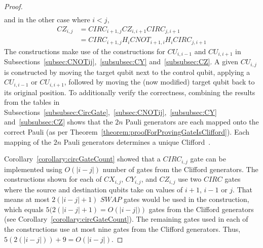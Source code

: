 \begin{proof}
\begin{align}
\end{align}
and in the other case where $i < j$,
\begin{align}
\mathit{CZ}_{i,j} &= \mathit{CIRC}_{i+1,j}\mathit{CZ}_{i,i+1}\mathit{CIRC}_{j,i+1}\\
&= \mathit{CIRC}_{i+1,j}H_{i}\mathit{CNOT}_{i+1,i}H_{i}\mathit{CIRC}_{j,i+1}
\end{align}
The constructions make use of the constructions for $\mathit{CU}_{i,i-1}$ and $\mathit{CU}_{i,i+1}$ in Subsections~\ref{subsec:CNOTij},~\ref{subsubsec:CY} and~\ref{subsubsec:CZ}. A given $\mathit{CU}_{i,j}$ is constructed by moving the target qubit next to the control qubit, applying a $\mathit{CU}_{i,i-1}$ or $\mathit{CU}_{i,i+1}$, followed by moving the (now modified) target qubit back to its original position. To additionally verify the correctness, combining the results from the tables in Subsections~\ref{subsubsec:CircGate},~\ref{subsec:CNOTij},~\ref{subsubsec:CY} and~\ref{subsubsec:CZ} shows that the $2n$ Pauli generators are each mapped onto the correct Pauli (as per Theorem~\ref{theorem:proofForProvingGateIsClifford}). Each mapping of the $2n$ Pauli generators determines a unique Clifford~\cite{ozols2008clifford}.

Corollary~\ref{corollary:circGateCount} showed that a $\mathit{CIRC}_{i,j}$ gate can be implemented using $O \left(\lvert i - j \rvert \right)$ number of gates from the Clifford generators. The constructions shown for each of $\mathit{CX}_{i,j}$, $\mathit{CY}_{i,j}$, and $\mathit{CZ}_{i,j}$ use two $\mathit{CIRC}$ gates where the source and destination qubits take on values of $i+1$, $i-1$ or $j$. That means at most $2(\lvert i - j \rvert + 1)$ $\mathit{SWAP}$ gates would be used in the construction, which equals $5(2(\lvert i - j \rvert + 1) = O \left(\lvert i - j \rvert) \right)$ gates from the Clifford generators (see Corollary~\ref{corollary:circGateCount}). The remaining gates used in each of the constructions use at most nine gates from the Clifford generators. Thus, $5(2(\lvert i - j \rvert)) + 9 = O\left(\lvert i - j \rvert \right)$.
\end{proof}

